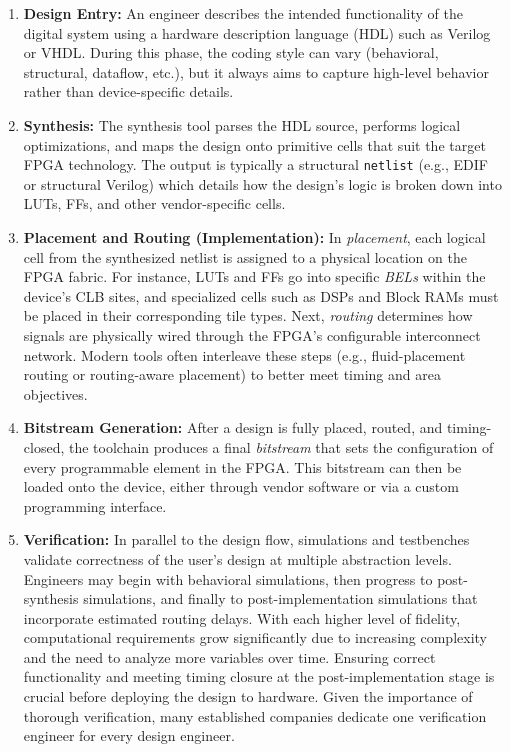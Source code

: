 \documentclass{article}
\begin{document}
\begin{multicols}{2}
    \begin{enumerate}
        \item \textbf{Design Entry:} 
            An engineer describes the intended functionality of the digital system using a hardware description language (HDL) such as Verilog or VHDL. 
            During this phase, the coding style can vary (behavioral, structural, dataflow, etc.), but it always aims to capture high-level behavior rather than device-specific details.

        \item \textbf{Synthesis:} 
            The synthesis tool parses the HDL source, performs logical optimizations, and maps the design onto primitive cells that suit the target FPGA technology. 
            The output is typically a structural \texttt{netlist} (e.g., EDIF or structural Verilog) which details how the design’s logic is broken down into LUTs, FFs, and other vendor-specific cells.

        \item \textbf{Placement and Routing (Implementation):} 
            In \emph{placement}, each logical cell from the synthesized netlist is assigned to a physical location on the FPGA fabric. 
            For instance, LUTs and FFs go into specific \emph{BELs} within the device’s CLB sites, and specialized cells such as DSPs and Block RAMs must be placed in their corresponding tile types. 
            Next, \emph{routing} determines how signals are physically wired through the FPGA’s configurable interconnect network. 
            Modern tools often interleave these steps (e.g., fluid-placement routing or routing-aware placement) to better meet timing and area objectives.

        \item \textbf{Bitstream Generation:} 
            After a design is fully placed, routed, and timing-closed, the toolchain produces a final \emph{bitstream} that sets the configuration of every programmable element in the FPGA. 
            This bitstream can then be loaded onto the device, either through vendor software or via a custom programming interface.

        \item \textbf{Verification:} 
            In parallel to the design flow, simulations and testbenches validate correctness of the user's design at multiple abstraction levels. 
            Engineers may begin with behavioral simulations, then progress to post-synthesis simulations, and finally to post-implementation simulations that incorporate estimated routing delays. 
            With each higher level of fidelity, computational requirements grow significantly due to increasing complexity and the need to analyze more variables over time. 
            Ensuring correct functionality and meeting timing closure at the post-implementation stage is crucial before deploying the design to hardware. 
            Given the importance of thorough verification, many established companies dedicate one verification engineer for every design engineer.


\end{enumerate}
\end{multicols}
\end{document}
